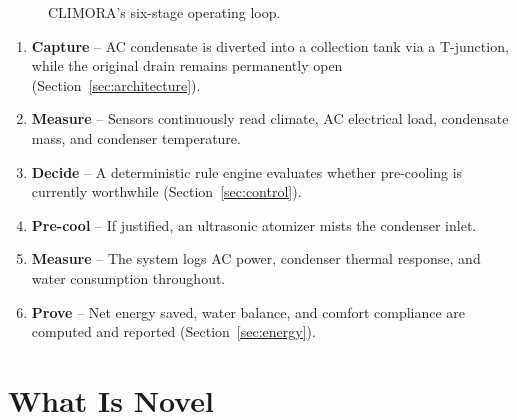 \documentclass[11pt,a4paper]{article}
\begin{document}
\begin{figure}[h!]
\centering
{}
\caption{CLIMORA's six-stage operating loop.}
\end{figure}

\begin{enumerate}
    \item \textbf{Capture} -- AC condensate is diverted into a collection tank via a T-junction, while the original drain remains permanently open (Section~\ref{sec:architecture}).
    \item \textbf{Measure} -- Sensors continuously read climate, AC electrical load, condensate mass, and condenser temperature.
    \item \textbf{Decide} -- A deterministic rule engine evaluates whether pre-cooling is currently worthwhile (Section~\ref{sec:control}).
    \item \textbf{Pre-cool} -- If justified, an ultrasonic atomizer mists the condenser inlet.
    \item \textbf{Measure} -- The system logs AC power, condenser thermal response, and water consumption throughout.
    \item \textbf{Prove} -- Net energy saved, water balance, and comfort compliance are computed and reported (Section~\ref{sec:energy}).
\end{enumerate}

\section{What Is Novel}
\label{sec:novelty}
\end{document}
